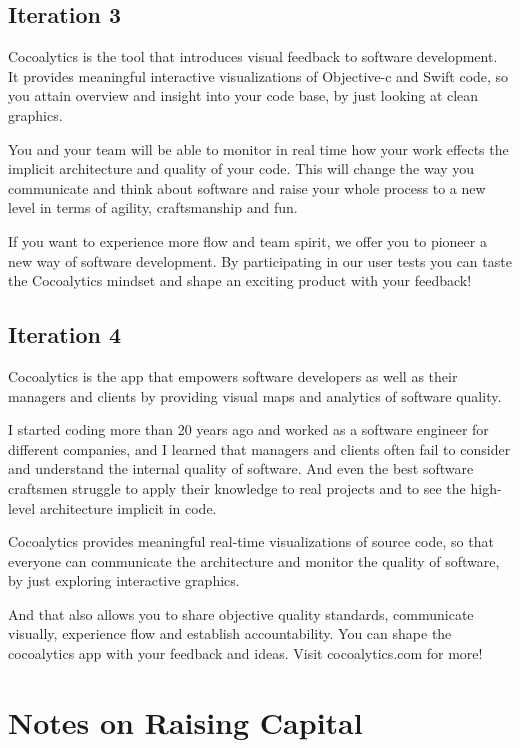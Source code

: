\documentclass{article}
\begin{document}
\subsection{Iteration 3}

Cocoalytics is the tool that introduces visual feedback to software development. It provides meaningful interactive visualizations of Objective-c and Swift code, so you attain overview and insight into your code base, by just looking at clean graphics.

You and your team will be able to monitor in real time how your work effects the implicit architecture and quality of your code. This will change the way you communicate and think about software and raise your whole process to a new level in terms of agility, craftsmanship and fun.

If you want to experience more flow and team spirit, we offer you to pioneer a new way of software development. By participating in our user tests you can taste the Cocoalytics mindset and shape an exciting product with your feedback!

\subsection{Iteration 4}

Cocoalytics is the app that empowers software developers as well as their managers and clients by providing visual maps and analytics of software quality.

I started coding more than 20 years ago and worked as a software engineer for different companies, and I learned that managers and clients often fail to consider and understand the internal quality of software. And even the best software craftsmen struggle to apply their knowledge to real projects and to see the  high-level architecture implicit in code.

Cocoalytics provides meaningful real-time visualizations of source code, so that everyone can communicate the architecture and monitor the quality of software, by just exploring interactive graphics.

And that also allows you to share objective quality standards, communicate visually, experience flow and establish accountability. You can shape the cocoalytics app with your feedback and ideas. Visit cocoalytics.com for more!

\section{Notes on Raising Capital}
\end{document}
